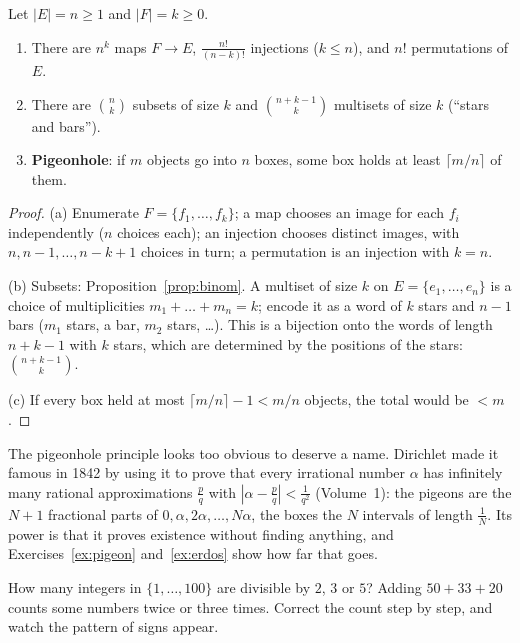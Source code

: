 \begin{proposition}\label{prop:counts}
Let $|E|=n\ge1$ and $|F|=k\ge0$.
\begin{enumerate}[label=(\alph*)]
\item There are $n^k$ maps $F\to E$, $\frac{n!}{(n-k)!}$ injections ($k\le n$), and $n!$ permutations of $E$.
\item There are $\binom nk$ subsets of size $k$ and $\binom{n+k-1}k$ multisets of size $k$ (``stars and bars'').
\item \textbf{Pigeonhole}: if $m$ objects go into $n$ boxes, some box holds at least $\lceil m/n\rceil$ of them.
\end{enumerate}
\end{proposition}
\begin{proof}
(a) Enumerate $F=\{f_1,\dots,f_k\}$; a map chooses an image for each $f_i$ independently ($n$ choices each); an injection chooses distinct images, with $n,n-1,\dots,n-k+1$ choices in turn; a permutation is an injection with $k=n$.

(b) Subsets: Proposition~\ref{prop:binom}. A multiset of size $k$ on $E=\{e_1,\dots,e_n\}$ is a choice of multiplicities $m_1+\dots+m_n=k$; encode it as a word of $k$ stars and $n-1$ bars ($m_1$ stars, a bar, $m_2$ stars, \dots). This is a bijection onto the words of length $n+k-1$ with $k$ stars, which are determined by the positions of the stars: $\binom{n+k-1}k$.

(c) If every box held at most $\lceil m/n\rceil-1<m/n$ objects, the total would be $<m$.
\end{proof}

The pigeonhole principle looks too obvious to deserve a name. Dirichlet made it famous in 1842 by using it to prove that every irrational number $\alpha$ has infinitely many rational approximations $\frac pq$ with $\left|\alpha-\frac pq\right|<\frac1{q^2}$ (Volume~1): the pigeons are the $N+1$ fractional parts of $0,\alpha,2\alpha,\dots,N\alpha$, the boxes the $N$ intervals of length $\frac1N$. Its power is that it proves existence without finding anything, and Exercises~\ref{ex:pigeon} and~\ref{ex:erdos} show how far that goes.

\begin{think}
How many integers in $\{1,\dots,100\}$ are divisible by $2$, $3$ or $5$? Adding $50+33+20$ counts some numbers twice or three times. Correct the count step by step, and watch the pattern of signs appear.
\end{think}

